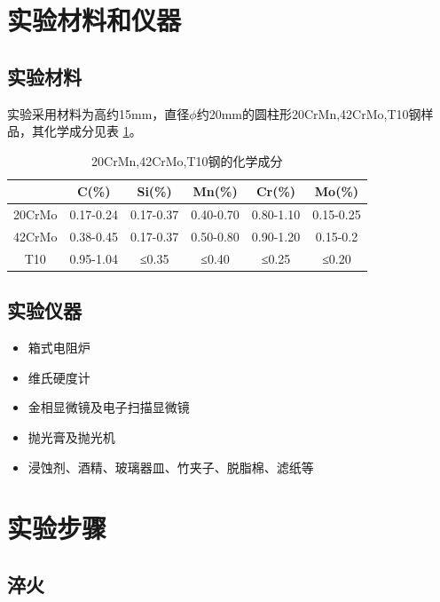 \documentclass[12pt]{ctexart}
\begin{document}
\section{实验材料和仪器}
\subsection{实验材料}
实验采用材料为高约15mm，直径$\phi$约20mm的圆柱形20CrMn,42CrMo,T10钢样品，其化学成分见表 \ref{huaxuechengfen}。

\begin{table}[ht!]
  \centering
  \caption{20CrMn,42CrMo,T10钢的化学成分}
  \label{huaxuechengfen}
  \begin{tabular}{cccccc}
    \toprule
    &C(\%)&Si(\%)&Mn(\%)&Cr(\%)&Mo(\%)\\
    \midrule
    20CrMo&0.17-0.24&0.17-0.37&0.40-0.70&0.80-1.10&0.15-0.25\\
    42CrMo&0.38-0.45&0.17-0.37&0.50-0.80&0.90-1.20&0.15-0.2\\
    T10   &0.95-1.04&≤0.35    &≤0.40    &≤0.25    &≤0.20\\
    \bottomrule
  \end{tabular}
\end{table}

\subsection{实验仪器}
\begin{itemize}
  \item 箱式电阻炉
  \item 维氏硬度计
  \item 金相显微镜及电子扫描显微镜
  \item 抛光膏及抛光机
  \item 浸蚀剂、酒精、玻璃器皿、竹夹子、脱脂棉、滤纸等
\end{itemize}

\section{实验步骤}
\subsection{淬火}
\end{document}
